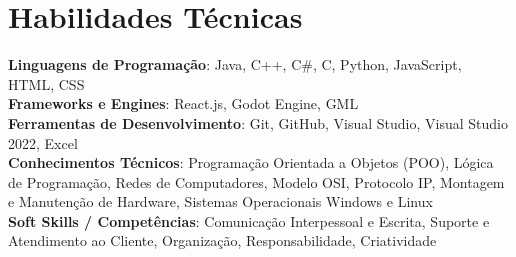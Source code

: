 \documentclass[a4paper,11pt]{article}
\begin{document}
\section{\textbf{Habilidades Técnicas}}
\begin{itemize}[leftmargin=0.05in, label={}]
    \small{\item{
     \textbf{Linguagens de Programação}{: Java, C++, C\#, C, Python, JavaScript, HTML, CSS} \\ [1.5pt]
     \textbf{Frameworks e Engines}{: React.js, Godot Engine, GML} \\ [1.5pt]
     \textbf{Ferramentas de Desenvolvimento}{: Git, GitHub, Visual Studio, Visual Studio 2022, Excel} \\ [1.5pt]
     \textbf{Conhecimentos Técnicos}{: Programação Orientada a Objetos (POO), Lógica de Programação, Redes de Computadores, Modelo OSI, Protocolo IP, Montagem e Manutenção de Hardware, Sistemas Operacionais Windows e Linux} \\ [1.5pt]
     \textbf{Soft Skills / Competências}{: Comunicação Interpessoal e Escrita, Suporte e Atendimento ao Cliente, Organização, Responsabilidade, Criatividade}
    }}
\end{itemize}
\vspace{-16pt}
\end{document}
